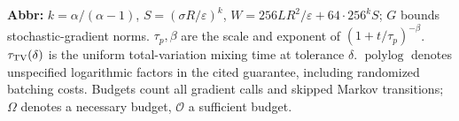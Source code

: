\begin{table}[tp]
\begin{threeparttable}
\begin{tabularx}{\linewidth}{@{}>{\raggedright\arraybackslash}p{0.20\linewidth}>{\raggedright\arraybackslash}p{0.32\linewidth}>{\raggedright\arraybackslash}p{0.25\linewidth}>{\raggedright\arraybackslash}X@{}}
\bottomrule
\end{tabularx}
\begin{tablenotes}[flushleft]\footnotesize
\item[] \textbf{Abbr:} $k=\alpha/(\alpha-1)$, $S=(\sigma R/\varepsilon)^k$, $W=256LR^2/\varepsilon+64\cdot256^k S$; $G$ bounds stochastic-gradient norms. $\tau_p,\beta$ are the scale and exponent of $(1+t/\tau_p)^{-\beta}$. $\tau_{\rm TV}(\delta)$ is the uniform total-variation mixing time at tolerance $\delta$. $\operatorname{polylog}$ denotes unspecified logarithmic factors in the cited guarantee, including randomized batching costs. Budgets count all gradient calls and skipped Markov transitions; $\Omega$ denotes a necessary budget, $\mathcal{O}$ a sufficient budget.
\end{tablenotes}
\end{threeparttable}
\end{table}
\clearpage
